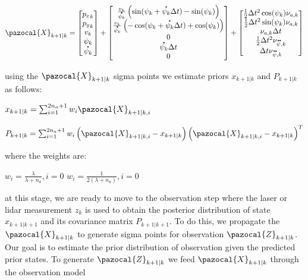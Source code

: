 \documentclass[a4paper,12pt]{article}
\newcommand*{\dt}[1]{%
  \accentset{\mbox{\large\bfseries .}}{#1}}
\newcommand*{\ddt}[1]{%
  \accentset{\mbox{\large\bfseries .\hspace{-0.25ex}.}}{#1}}
\begin{document}
   \begin{align}  
  \pazocal{X}_{k+1|k}=
         \begin{bmatrix}
         {p_{x}}_k \\
         {p_{y}}_k \\ 
         v_k \\
         \psi_k \\
         \dt{\psi_k} \\
         \end{bmatrix}  
  + 
  		 \begin{bmatrix}
         \frac{v_k}{\dt{\psi_k}}\left(\sin(\psi_k+\dt{\psi_k} \Delta t) -\sin(\psi_k) \right)\\
         \frac{v_k}{\dt{\psi_k}}\left(-\cos(\psi_k+\dt{\psi_k} \Delta t) +\cos(\psi_k) \right)\\
         0 \\
         \dt{\psi_k}\Delta t \\
         0 \\
         \end{bmatrix} 
+
  		 \begin{bmatrix}
         \frac{1}{2}\Delta t^2\cos(\psi_k)\nu_{a,k}\\
         \frac{1}{2}\Delta t^2\sin(\psi_k)\nu_{a,k}\\
         \nu_{a,k}\Delta t\\
         \frac{1}{2}\Delta t^2\nu_{\ddt{\psi},k}\\
         \Delta t\nu_{\ddt{\psi},k}\\
         \end{bmatrix} 
  \end{align} 

using the $\pazocal{X}_{k+1|k}$ sigma points we estimate priors $x_{k+1|k}$ and $P_{k+1|k}$ as follows:

$x_{k+1|k} = \sum_{i=1}^{2n_a+1}w_i\pazocal{X}_{k+1|k,i}$

$P_{k+1|k} = \sum_{i=1}^{2n_a+1}w_i\left(\pazocal{X}_{k+1|k,i}-x_{k+1|k}\right)\left(\pazocal{X}_{k+1|k,i}-x_{k+1|k}\right)^{T}$

where the weights are:

$w_i = \frac{\lambda}{\lambda+n_a}, i = 0$
$w_i = \frac{1}{2(\lambda+n_a)}, i = 0$


at this stage, we are ready to move to the observation step where the laser or lidar measurement $z_k$ is used to obtain the posterior distribution of state $x_{k+1|k+1}$ and its covariance matrix $P_{k+1|k+1}$. To do this, we propagate the $\pazocal{X}_{k+1|k}$ to generate sigma points for observation $\pazocal{Z}_{k+1|k}$. Our goal is to estimate the prior distribution of observation given the predicted prior states. To generate $\pazocal{Z}_{k+1|k}$ we feed $\pazocal{X}_{k+1|k}$ through the observation model 
\end{document}

